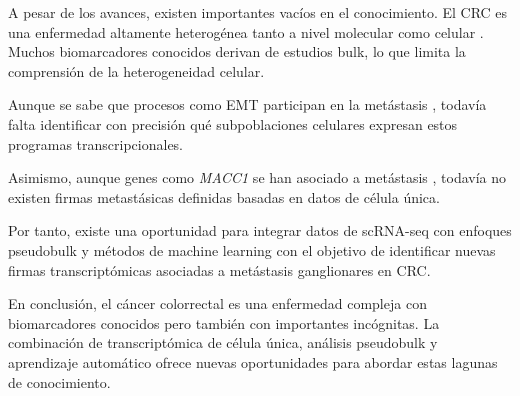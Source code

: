 \documentclass[11pt]{article}
\begin{document}
A pesar de los avances, existen importantes vacíos en el conocimiento. El CRC es una enfermedad altamente heterogénea tanto a nivel molecular como celular \cite{ref2}. Muchos biomarcadores conocidos derivan de estudios bulk, lo que limita la comprensión de la heterogeneidad celular.

Aunque se sabe que procesos como EMT participan en la metástasis \cite{ref8}, todavía falta identificar con precisión qué subpoblaciones celulares expresan estos programas transcripcionales.

Asimismo, aunque genes como \textit{MACC1} se han asociado a metástasis \cite{ref3}, todavía no existen firmas metastásicas definidas basadas en datos de célula única.

Por tanto, existe una oportunidad para integrar datos de scRNA-seq con enfoques pseudobulk y métodos de machine learning con el objetivo de identificar nuevas firmas transcriptómicas asociadas a metástasis ganglionares en CRC.

En conclusión, el cáncer colorrectal es una enfermedad compleja con biomarcadores conocidos pero también con importantes incógnitas. La combinación de transcriptómica de célula única, análisis pseudobulk y aprendizaje automático ofrece nuevas oportunidades para abordar estas lagunas de conocimiento.

%
%
\end{document}
